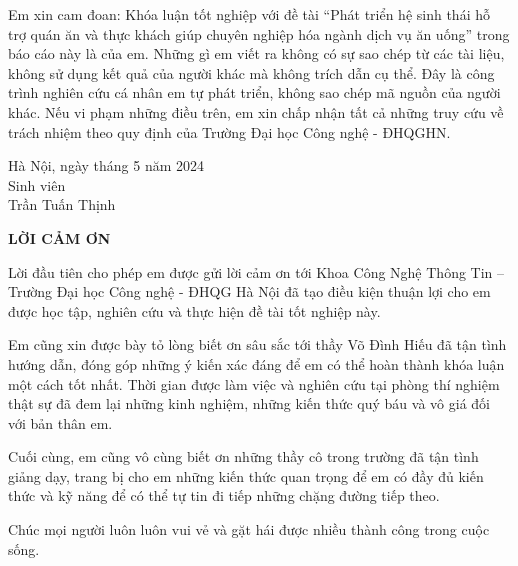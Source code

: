Em xin cam đoan: Khóa luận tốt nghiệp với đề tài “Phát triển hệ sinh thái hỗ trợ quán ăn và thực khách giúp chuyên nghiệp hóa ngành dịch vụ ăn uống” trong báo cáo này là của em.
Những gì em viết ra không có sự sao chép từ các tài liệu, không sử dụng kết quả của người khác mà không trích dẫn cụ thể.
Đây là công trình nghiên cứu cá nhân em tự phát triển, không sao chép mã nguồn của người khác.
Nếu vi phạm những điều trên, em xin chấp nhận tất cả những truy cứu về trách nhiệm theo quy định của Trường Đại học Công nghệ - ĐHQGHN.

\begin{flushright}
	\begin{varwidth}{\linewidth}\centering
		Hà Nội, ngày  tháng 5 năm 2024\\
		Sinh viên\\[2cm]
		Trần Tuấn Thịnh
	\end{varwidth}
\end{flushright}

\newpage

\begin{center}
    \textbf{LỜI CẢM ƠN}
\end{center}

Lời đầu tiên cho phép em được gửi lời cảm ơn tới Khoa Công Nghệ Thông Tin – Trường Đại học Công nghệ - ĐHQG Hà Nội đã tạo điều kiện thuận lợi cho em được học tập, nghiên cứu và thực hiện đề tài tốt nghiệp này.

Em cũng xin được bày tỏ lòng biết ơn sâu sắc tới thầy Võ Đình Hiếu đã tận tình hướng dẫn, đóng góp những ý kiến xác đáng để em có thể hoàn thành khóa luận một cách tốt nhất.
Thời gian được làm việc và nghiên cứu tại phòng thí nghiệm thật sự đã đem lại những kinh nghiệm, những kiến thức quý báu và vô giá đối với bản thân em.

Cuối cùng, em cũng vô cùng biết ơn những thầy cô trong trường đã tận tình giảng dạy, trang bị cho em những kiến thức quan trọng để em có đầy đủ kiến thức và kỹ năng để có thể tự tin đi tiếp những chặng đường tiếp theo.

Chúc mọi người luôn luôn vui vẻ và gặt hái được nhiều thành công trong cuộc sống.

